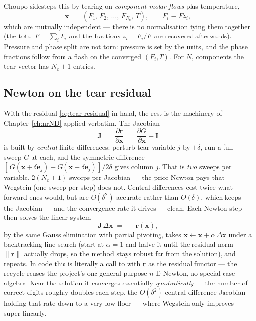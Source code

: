 \documentclass[11pt,a4paper]{article}
\newcommand{\Jac}{\mathbf{J}}
\begin{document}
Choupo sidesteps this by tearing on \emph{component molar flows} plus
temperature,
\begin{equation}
   \mathbf{x} \;=\; (F_1,\, F_2,\, \dots,\, F_{N_c},\, T),
   \qquad F_i \equiv F z_i,
   \label{eq:tear-vars}
\end{equation}
which are mutually independent --- there is no normalisation tying them
together (the total $F = \sum_i F_i$ and the fractions $z_i = F_i/F$
are recovered afterwards).  Pressure and phase split are not torn:
pressure is set by the units, and the phase fractions follow from a
flash on the converged $(F_i, T)$.  For $N_c$ components the tear
vector has $N_c + 1$ entries.

\subsection{Newton on the tear residual}

With the residual \eqref{eq:tear-residual} in hand, the rest is the
machinery of Chapter~\ref{ch:nrND} applied verbatim.  The Jacobian
\begin{equation}
   \Jac \;=\; \frac{\partial \mathbf{r}}{\partial \mathbf{x}}
        \;=\; \frac{\partial G}{\partial \mathbf{x}} - \mathbf{I}
\end{equation}
is built by \emph{central} finite differences: perturb tear variable
$j$ by $\pm\delta$, run a full sweep $G$ at each, and the symmetric
difference $[\,G(\mathbf{x}+\delta\mathbf{e}_j) -
G(\mathbf{x}-\delta\mathbf{e}_j)\,]/2\delta$ gives column $j$.  That is
\emph{two} sweeps per variable, $2(N_c + 1)$ sweeps per Jacobian ---
the price Newton pays that Wegstein (one sweep per step) does not.
Central differences cost twice what forward ones would, but are
$O(\delta^2)$ accurate rather than $O(\delta)$, which keeps the
Jacobian --- and the convergence rate it drives --- clean.
Each Newton step then solves the linear system
\begin{equation}
   \Jac\, \Delta\mathbf{x} \;=\; -\,\mathbf{r}(\mathbf{x}),
\end{equation}
by the same Gauss elimination with partial pivoting, takes
$\mathbf{x} \leftarrow \mathbf{x} + \alpha\,\Delta\mathbf{x}$ under a
backtracking line search (start at $\alpha = 1$ and halve it until the
residual norm $\|\mathbf{r}\|$ actually drops, so the method stays
robust far from the solution), and repeats.  In code this is literally
a call to  with $\mathbf{r}$ as the residual
functor --- the recycle reuses the project's one general-purpose $n$-D
Newton, no special-case algebra.  Near the solution it converges
essentially \emph{quadratically} --- the number of correct digits
roughly doubles each step, the $O(\delta^2)$ central-difference
Jacobian holding that rate down to a very low floor --- where Wegstein
only improves super-linearly.
\end{document}
